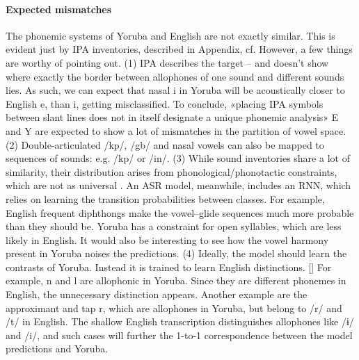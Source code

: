 \documentclass[11pt]{article}
\newcommand{\ipa}[1]{{\ipafont #1}}
\begin{document}
\paragraph{Expected mismatches} The phonemic systems of Yoruba and English are not exactly similar. This is evident just by IPA inventories, described in Appendix, cf. \cite{Adesola2024}\cite{AhiaEtAl2024}\cite{moran2014} However, a few things are worthy of pointing out. (1) IPA describes the target -- and doesn't show where exactly the border between allophones of one sound and different sounds lies. As such, we can expect that nasal i in Yoruba will be acoustically closer to English e, than i, getting misclassified. To conclude, «placing IPA symbols between slant lines does not in itself designate a unique phonemic analysis» \cite*{vanderhulst2017} E and Y are expected to show a lot of mismatches in the partition of vowel space. (2) Double-articulated /kp/, /gb/ and nasal vowels can also be mapped to sequences of sounds: e.g. /kp/ or /in/. (3) While sound inventories share a lot of similarity, their distribution arises from phonological/phonotactic constraints, which are not as universal \cite{maddieson2010}. An ASR model, meanwhile, includes an RNN, which relies on learning the transition probabilities between classes. For example, English frequent diphthongs make the vowel--glide sequences much more probable than they should be. Yoruba has a constraint for open syllables, which are less likely in English. It would also be interesting to see how the vowel harmony present in Yoruba noises the predictions. (4) Ideally, the model should learn the contrasts of Yoruba. Instead it is trained to learn English distinctions. [] For example, n and l are allophonic in Yoruba. Since they are different phonemes in English, the unnecessary distinction appears. Another example are the approximant and tap r, which are allophones in Yoruba, but belong to /r/ and /t/ in English. The shallow English transcription distinguishes allophones like \ipa{/ɨ/} and \ipa{/i/}, and such cases will further the 1-to-1 correspondence between the model predictions and Yoruba.
\end{document}
